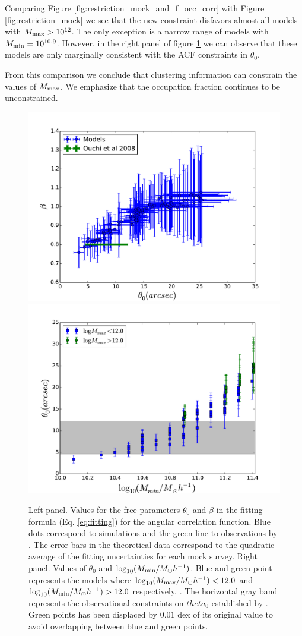 \documentclass[usenatbib]{mn2e}
\begin{document}
Comparing Figure \ref{fig:restriction_mock_and_f_occ_corr} with Figure
\ref{fig:restriction_mock} we see that the new constraint disfavors
almost all models with $M_{\rm max}>10^{12}$. The only exception is a
narrow range of models with $M_{\rm min}=10^{10.9}$. However, in the
right panel of figure  \ref{fig:correlation_parameters}   we can
observe that these models are only  marginally consistent with the ACF
constraints in  $\theta_0$. 

From this comparison we conclude that clustering information can
constrain the values of $M_{\rm max}$. We emphasize that the
occupation fraction continues to be unconstrained. 


\begin{figure}
\begin{center}
\includegraphics[width=0.46\linewidth,angle=0]{Fig7_corr_params.pdf}  
\includegraphics[width=0.46\linewidth,angle=0]{Fig7_mmin_vs_theta.pdf} 
\end{center}
\caption{Left panel. Values for the free parameters $\theta_{0}$ and $\beta$
in the fitting formula (Eq. \ref{eq:fitting}) for the angular
correlation function. Blue dots correspond to simulations and the
green line to observations by \citet{Ouchi2008,Ouchi2010}. The error
bars in the theoretical data correspond to the quadratic average of
the fitting uncertainties for each mock survey. Right panel. Values of
$\theta_{0}$  and $\log_{10}(M_{\rm min}/M_{\odot} h^{-1})$. Blue and
green point represents the models where  $\log_{10}(M_{\rm max}/M_{\odot}
h^{-1})<12.0$ and  $\log_{10}(M_{\rm min}/M_{\odot} h^{-1})>12.0$
respectively. .  The horizontal gray band represents the observational
constraints on $theta_{0}$ established by
\citet{Ouchi2008,Ouchi2010}. Green points has been displaced by
$0.01$ dex of its original value to avoid overlapping between blue and
green points.} \label{fig:correlation_parameters}   
\end{figure}
\end{document}
